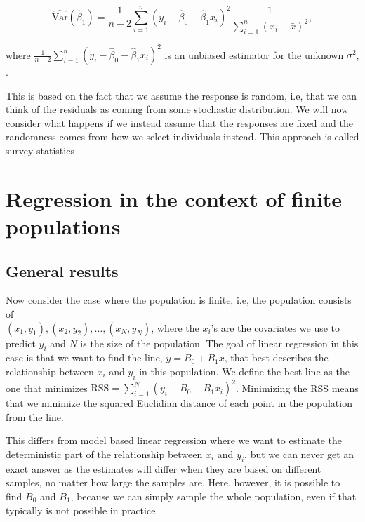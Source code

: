 \documentclass{article}
\begin{document}
\begin{equation*}
 \widehat{\mathrm{Var}} \left( \hat{\beta}_1 \right) = \frac{1}{n - 2} \sum_{i = 1}^n\left( y_i - \hat{\beta}_0 -
 \hat{\beta}_1 x_i \right)^2\frac{1}{
   \sum_{i = 1}^n \left( x_i - \bar{x} \right)^2},
\end{equation*}

where \(\frac{1}{n - 2} \sum_{i = 1}^n\left( y_i - \hat{\beta}_0 -
 \hat{\beta}_1 x_i \right)^2\) is an
unbiased estimator for the unknown \(\sigma^2\), \cite[Chapter 11]{st1101}.

This is based on the fact that we assume the response is random, i.e, that we
can think of the residuals as coming from some stochastic distribution. We will
now consider what happens if we instead assume that the responses are fixed and the
randomness comes from how we select individuals instead.
This approach is called survey statistics


\section{Regression in the context of finite populations} \label{sec:RegFinPop}

\subsection{General results} \label{sec:generalResults}

Now consider the case where the population is finite, i.e, the population
consists of \\
\((x_1, y_1), (x_2, y_2), \dots , (x_N, y_N)\), where the \(x_i\)'s are the covariates we use to
predict \(y_i\) and \(N\) is the size of the population.
The goal of linear regression in this case is that we want to find the
line, \(y = B_0 + B_1x\), that best describes the relationship between \(x_i\)
and \(y_i\) in this population. We define the best line as the one
that minimizes \(\mathrm{RSS} = \sum_{i = 1}^N (y_i - B_0 - B_1 x_i)^2\).
Minimizing the RSS means that we minimize the squared Euclidian distance of each point
in the population from the line.

This differs from model based linear regression where we want to estimate the
deterministic part of the relationship between \(x_i\) and \(y_i\), but we can
never get an exact answer as the estimates will differ when they are based on
different samples, no matter how large the samples are. Here, however, it is possible to find \(B_0\) and
\(B_1\), because we can simply sample the whole population, even if that typically
is not possible in practice.
\end{document}
